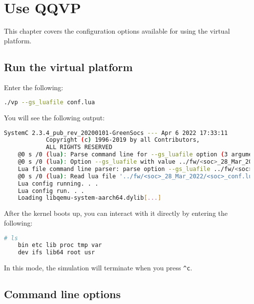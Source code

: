 \chapter{Use QQVP}

This chapter covers the configuration options available for using the virtual platform.


\section{Run the virtual platform}

Enter the following:

\small
\begin{lstlisting}[language=bash]
    ./vp --gs_luafile conf.lua
\end{lstlisting}
\normalsize

You will see the following output:

\small
\begin{lstlisting}[language=bash]
            SystemC 2.3.4_pub_rev_20200101-GreenSocs --- Apr 6 2022 17:33:11
            Copyright (c) 1996-2019 by all Contributors,
            ALL RIGHTS RESERVED
    @0 s /0 (lua): Parse command line for --gs_luafile option (3 arguments)
    @0 s /0 (lua): Option --gs_luafile with value ../fw/<soc>_28_Mar_2022/<soc>_conf.lua
    Lua file command line parser: parse option --gs_luafile ../fw/<soc>_28_Mar_2022/<soc>_conf.lua
    @0 s /0 (lua): Read lua file '../fw/<soc>_28_Mar_2022/<soc>_conf.lua'
    Lua config running. . .
    Lua config run. . .
    Loading libqemu-system-aarch64.dylib[...]
\end{lstlisting}
\normalsize


After the kernel boots up, you can interact with it directly by entering the following:

\small
\begin{lstlisting}[language=bash]
    # ls
    bin etc lib proc tmp var
    dev ifs lib64 root usr
\end{lstlisting}
\normalsize

\note In this mode, the simulation will terminate when you press {\small{\lstinline!^c!}}.


\clearpage
\section{Command line options}

